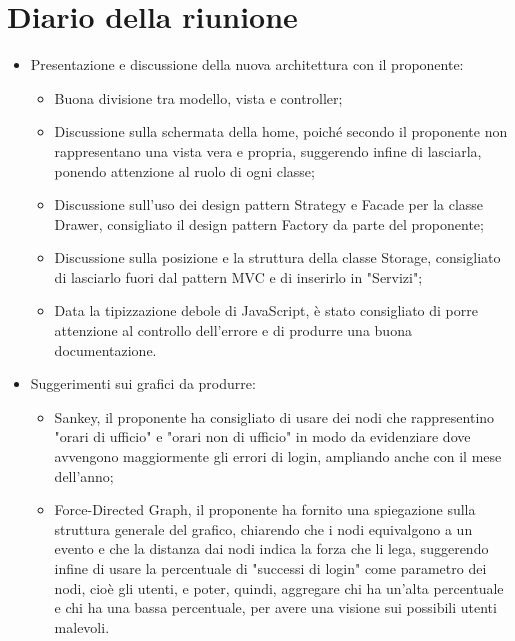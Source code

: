 \section{Diario della riunione}
\begin{itemize}
  \item Presentazione e discussione della nuova architettura con il proponente:
    \begin{itemize}
      \item Buona divisione tra modello, vista e controller;
      \item Discussione sulla schermata della home, poiché secondo il proponente non rappresentano una vista vera e propria, suggerendo infine di lasciarla, ponendo attenzione al ruolo di ogni classe;
      \item Discussione sull'uso dei design pattern Strategy e Facade per la classe Drawer, consigliato il design pattern Factory da parte del proponente;
      \item Discussione sulla posizione e la struttura della classe Storage, consigliato di lasciarlo fuori dal pattern MVC e di inserirlo in "Servizi";
      \item Data la tipizzazione debole di JavaScript, è stato consigliato di porre attenzione al controllo dell'errore e di produrre una buona documentazione.
    \end{itemize}
  \item Suggerimenti sui grafici da produrre:
    \begin{itemize}
      \item Sankey, il proponente ha consigliato di usare dei nodi che rappresentino "orari di ufficio" e "orari non di ufficio" in modo da evidenziare dove avvengono maggiormente gli errori di login, ampliando anche con il mese dell'anno;
      \item Force-Directed Graph, il proponente ha fornito una spiegazione sulla struttura generale del grafico, chiarendo che i nodi equivalgono a un evento e che la distanza dai nodi indica la forza che li lega, suggerendo infine di usare la percentuale di "successi di login" come parametro dei nodi, cioè gli utenti, e poter, quindi, aggregare chi ha un'alta percentuale e chi ha una bassa percentuale, per avere una visione sui possibili utenti malevoli.
    \end{itemize} 
\end{itemize}